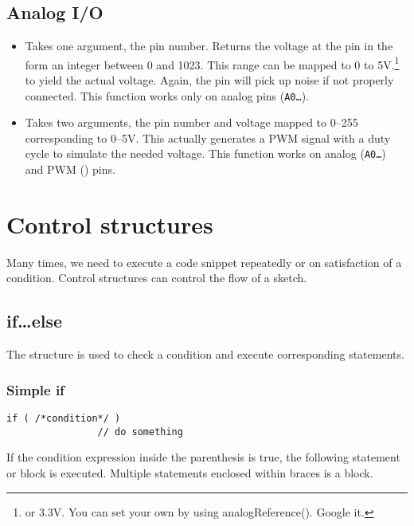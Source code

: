 \documentclass{article}
\begin{document}
	\subsection{Analog I/O}

		\begin{itemize}

			\item {} Takes one argument, the pin number. Returns the voltage at the pin in the form an integer between 0 and 1023. This range can be mapped to 0 to 5V.\footnote{or 3.3V. You can set your own by using analogReference(). Google it.} to yield the actual voltage. Again, the pin will pick up noise if not properly connected. This function works only on analog pins (\texttt{A0\ldots}).

			\item {} Takes two arguments, the pin number and voltage mapped to 0--255 corresponding to 0--5V. This actually generates a PWM signal with a duty cycle to simulate the needed voltage. This function works on analog (\texttt{A0\ldots}) and PWM (\texttt{\raisebox{0.5ex}{\texttildelow}}) pins.

		\end{itemize}

\section{Control structures}

	Many times, we need to execute a code snippet repeatedly or on satisfaction of a condition. Control structures can control the flow of a sketch. 

	\subsection{if\ldots else}

		The  structure is used to check a condition and execute corresponding statements.

		\subsubsection{Simple if}

			\begin{lstlisting}[gobble=12]
			if ( /*condition*/ )
				// do something
			\end{lstlisting}

			If the condition expression inside the parenthesis is true, the following statement or block is executed. Multiple statements enclosed within braces is a block.
\end{document}
